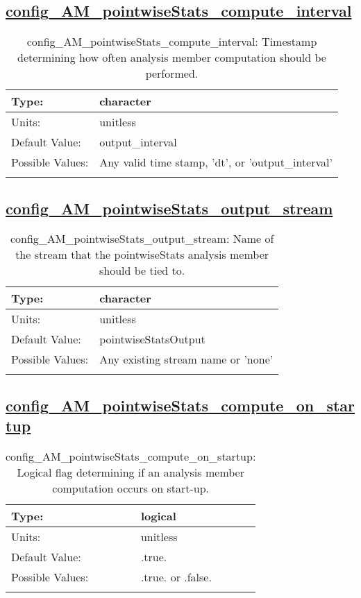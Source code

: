 \subsection[config\_AM\_pointwiseStats\_compute\_interval]{\hyperref[sec:nm_tab_AM_pointwiseStats]{config\_AM\_pointwiseStats\_compute\_interval}}
\label{subsec:nm_sec_config_AM_pointwiseStats_compute_interval}
\begin{center}
\begin{longtable}{| p{2.0in} || p{4.0in} |}
    \hline
    Type: & character \\
    \hline
    Units: & \si{unitless} \\
    \hline
    Default Value: & output\_interval \\
    \hline
    Possible Values: & Any valid time stamp, 'dt', or 'output\_interval' \\
    \hline
    \caption{config\_AM\_pointwiseStats\_compute\_interval: Timestamp determining how often analysis member computation should be performed.}
\end{longtable}
\end{center}
\subsection[config\_AM\_pointwiseStats\_output\_stream]{\hyperref[sec:nm_tab_AM_pointwiseStats]{config\_AM\_pointwiseStats\_output\_stream}}
\label{subsec:nm_sec_config_AM_pointwiseStats_output_stream}
\begin{center}
\begin{longtable}{| p{2.0in} || p{4.0in} |}
    \hline
    Type: & character \\
    \hline
    Units: & \si{unitless} \\
    \hline
    Default Value: & pointwiseStatsOutput \\
    \hline
    Possible Values: & Any existing stream name or 'none' \\
    \hline
    \caption{config\_AM\_pointwiseStats\_output\_stream: Name of the stream that the pointwiseStats analysis member should be tied to.}
\end{longtable}
\end{center}
\subsection[config\_AM\_pointwiseStats\_compute\_on\_startup]{\hyperref[sec:nm_tab_AM_pointwiseStats]{config\_AM\_pointwiseStats\_compute\_on\_startup}}
\label{subsec:nm_sec_config_AM_pointwiseStats_compute_on_startup}
\begin{center}
\begin{longtable}{| p{2.0in} || p{4.0in} |}
    \hline
    Type: & logical \\
    \hline
    Units: & \si{unitless} \\
    \hline
    Default Value: & .true. \\
    \hline
    Possible Values: & .true. or .false. \\
    \hline
    \caption{config\_AM\_pointwiseStats\_compute\_on\_startup: Logical flag determining if an analysis member computation occurs on start-up.}
\end{longtable}
\end{center}

